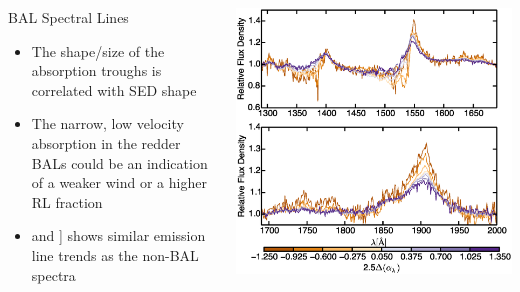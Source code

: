 \documentclass[landscape,9pt]{beamer}
\begin{document}
\begin{frame}
	\begin{columns}
	\begin{column}{.35\textwidth}
		\begin{block}{BAL Spectral Lines}
		\begin{itemize}
			\item The shape/size of the absorption troughs is correlated with SED shape
			\item The narrow, low velocity absorption in the redder BALs could be an indication of a weaker wind or a higher RL fraction
			\item {} and ] shows similar emission line trends as the non-BAL spectra
		\end{itemize}
		\end{block}
	\end{column}
	\begin{column}{.75\textwidth}
		\includegraphics[width=\textwidth]{../images/Dust/f15}
	\end{column}
	\end{columns}
\end{frame}
\end{document}
